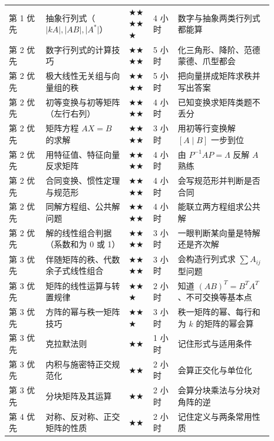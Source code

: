 \documentclass[11pt,openany,UTF8]{ctexbook}
\begin{document}
\begin{longtable}{@{}L{0.1291\linewidth}L{0.2758\linewidth}L{0.0878\linewidth}L{0.0878\linewidth}L{0.3136\linewidth}@{}}
第 1 优先 & 抽象行列式（$\lvert kA\rvert,\lvert AB\rvert,\lvert A^*\rvert$） & $\bigstar$$\bigstar$$\bigstar$$\bigstar$$\bigstar$ & 4 小时 & 数字与抽象两类行列式都能算 \\
第 2 优先 & 数字行列式的计算技巧 & $\bigstar$$\bigstar$$\bigstar$$\bigstar$ & 5 小时 & 化三角形、降阶、范德蒙德、爪型都会 \\
第 2 优先 & 极大线性无关组与向量组的秩 & $\bigstar$$\bigstar$$\bigstar$$\bigstar$ & 5 小时 & 把向量拼成矩阵求秩并写出答案 \\
第 2 优先 & 初等变换与初等矩阵（左行右列） & $\bigstar$$\bigstar$$\bigstar$$\bigstar$ & 4 小时 & 已知变换求矩阵类题不丢分 \\
第 2 优先 & 矩阵方程 $AX=B$ 的求解 & $\bigstar$$\bigstar$$\bigstar$$\bigstar$ & 3 小时 & 用初等行变换解 $[A\mid B]$ 一步到位 \\
第 2 优先 & 用特征值、特征向量反求矩阵 & $\bigstar$$\bigstar$$\bigstar$$\bigstar$ & 4 小时 & 由 $P^{-1}AP=\Lambda$ 反解 $A$ 熟练 \\
第 2 优先 & 合同变换、惯性定理与规范形 & $\bigstar$$\bigstar$$\bigstar$$\bigstar$ & 4 小时 & 会写规范形并判断是否合同 \\
第 2 优先 & 同解方程组、公共解问题 & $\bigstar$$\bigstar$$\bigstar$$\bigstar$ & 4 小时 & 能联立两方程组求公共解 \\
第 2 优先 & 解的线性组合判据（系数和为 0 或 1） & $\bigstar$$\bigstar$$\bigstar$$\bigstar$ & 3 小时 & 一眼判断某向量是特解还是齐次解 \\
第 3 优先 & 伴随矩阵的秩、代数余子式线性组合 & $\bigstar$$\bigstar$$\bigstar$$\bigstar$ & 3 小时 & 会构造行列式求 $\sum A_{ij}$ 型问题 \\
第 3 优先 & 矩阵的线性运算与转置规律 & $\bigstar$$\bigstar$$\bigstar$ & 2 小时 & 知道 $(AB)^T=B^TA^T$、不可交换等基本点 \\
第 3 优先 & 方阵的幂与秩一矩阵技巧 & $\bigstar$$\bigstar$$\bigstar$ & 3 小时 & 秩一矩阵的幂、每行和为 $k$ 的矩阵的幂会算 \\
第 3 优先 & 克拉默法则 & $\bigstar$$\bigstar$ & 1 小时 & 记住形式与适用条件 \\
第 3 优先 & 内积与施密特正交规范化 & $\bigstar$$\bigstar$ & 2 小时 & 会算正交化与单位化 \\
第 3 优先 & 分块矩阵及其运算 & $\bigstar$$\bigstar$ & 2 小时 & 会算分块乘法与分块对角阵的逆 \\
第 4 优先 & 对称、反对称、正交矩阵的性质 & $\bigstar$$\bigstar$ & 2 小时 & 记住定义与两条常用性质 \\
\bottomrule
\end{longtable}
\endgroup
\end{document}
